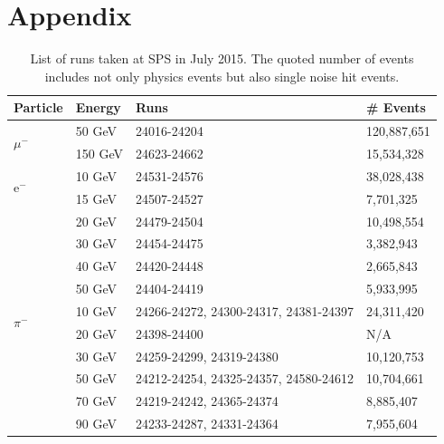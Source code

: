 \documentclass{JINST}
\begin{document}



% 

\clearpage

\appendix
\section{Appendix}
\label{appendix:Additional}
\setcounter{table}{0}
\renewcommand{\thetable}{A\arabic{table}}

\begin{table}[htb!]
  \centering
  \caption{List of runs taken at SPS in July 2015. The quoted number of events includes not only physics events but also single noise hit events.}
  \label{table:dataruns}
  \begin{tabular}{@{}lp{2cm}p{7.5cm}p{2cm}@{}}
    \toprule
    \multicolumn{1}{l}{\textbf{Particle}} & \textbf{Energy} & \textbf{Runs} & \textbf{\# Events}\\
    \midrule
    \multirow{2}{*}{$\mu^-$}& 50 GeV & 24016-24204 & 120,887,651\\& 150 GeV & 24623-24662 & 15,534,328\\
    \midrule
    \multirow{2}{*}{e$^-$}& 10 GeV & 24531-24576 & 38,028,438\\& 15 GeV & 24507-24527 & 7,701,325\\& 20 GeV & 24479-24504 & 10,498,554\\& 30 GeV & 24454-24475 & 3,382,943\\& 40 GeV & 24420-24448 & 2,665,843\\& 50 GeV & 24404-24419 & 5,933,995\\
    \midrule
    \multirow{2}{*}{$\pi^-$}& 10 GeV & 24266-24272, 24300-24317, 24381-24397 & 24,311,420\\& 20 GeV & 24398-24400 & N/A\footnotemark\\& 30 GeV & 24259-24299, 24319-24380 & 10,120,753\\& 50 GeV & 24212-24254, 24325-24357, 24580-24612 & 10,704,661\\& 70 GeV & 24219-24242, 24365-24374 & 8,885,407\\& 90 GeV & 24233-24287, 24331-24364 & 7,955,604\\
    \bottomrule
  \end{tabular}
\end{table}
\end{document}
